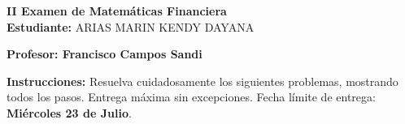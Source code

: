 \documentclass[10pt]{article}
\begin{document}
\begin{center}
    {\LARGE \textbf{II Examen de Matemáticas Financiera}}\\[1em]
    {\large \textbf{Estudiante:} ARIAS MARIN KENDY DAYANA}
\end{center}

\vspace{1cm}

\textbf{Profesor: Francisco Campos Sandi}

\vspace{0.5cm}

\textbf{Instrucciones:} Resuelva cuidadosamente los siguientes problemas, mostrando todos los pasos. Entrega máxima sin excepciones. Fecha límite de entrega: \textbf{Miércoles 23 de Julio}.

\vspace{1cm}
\end{document}
